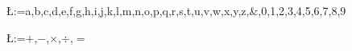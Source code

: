 \documentclass[a4paper]{article}
\begin{document}
\pagestyle{empty}

\setlength{\fboxsep}{30pt}

\makeatletter
\@for\L:={a,b,c,d,e,f,g,h,i,j,k,l,m,n,o,p,q,r,s,t,u,v,w,x,y,z,\&,0,1,2,3,4,5,6,7,8,9}\do{
  ~

  \vfill

  \centering\noindent\framebox{\scalebox{45}{\makebox[1em]{\strut\scshape\L}}}

  \vfill
  ~

  \pagebreak}

\@for\L:={$+$,$-$,$\times$,$\div$,$=$}\do{
  ~

  \vfill

  \centering\noindent\framebox{\scalebox{1.5}{\fontsize{250}{260}\selectfont{\strut\L}}}

  \vfill
  ~

  \pagebreak}


\makeatother
\end{document}
